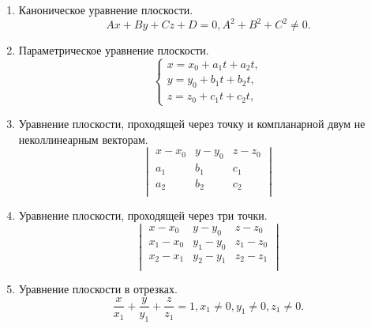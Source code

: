 \documentclass[12pt]{report}
\theoremstyle{definition}
\begin{document}
\begin{enumerate}
\item Каноническое уравнение плоскости.
  $$
    A x + B y + C z + D = 0,
    A^2 + B^2 + C^2 \ne 0.
  $$
\item Параметрическое уравнение плоскости.
  $$
    \begin{cases}
      x = x_0 + a_1 t + a_2 t, \\
      y = y_0 + b_1 t + b_2 t, \\
      z = z_0 + c_1 t + c_2 t,
    \end{cases}
  $$
\item Уравнение плоскости, проходящей через точку и
  компланарной двум не неколлинеарным векторам.
  $$
    \begin{vmatrix}
      x - x_0 & y - y_0 & z - z_0 \\
      a_1 & b_1 & c_1 \\
      a_2 & b_2 & c_2 \\
    \end {vmatrix}
  $$
\item Уравнение плоскости, проходящей через три точки.
$$
  \begin{vmatrix}
      x - x_0 & y - y_0 & z - z_0 \\
      x_1 - x_0 & y_1 - y_0 & z_1 - z_0  \\
      x_2 - x_1 & y_2 - y_1 & z_2 - z_1 \\
  \end {vmatrix}
$$
\item Уравнение плоскости в отрезках.
  $$
    \dfrac{x}{x_1} + \dfrac{y}{y_1} + \dfrac{z}{z_1} = 1,
    x_1 \ne 0, y_1 \ne 0, z_1 \ne 0.
  $$
\end{enumerate}
\end{document}
